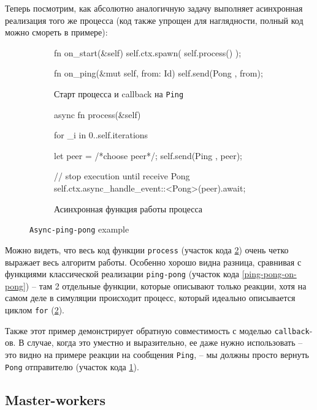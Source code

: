 Теперь посмотрим, как абсолютно аналогичную задачу выполняет асинхронная реализация того же процесса (код также упрощен для наглядности, полный код можно смореть в примере\cite{async-ping-pong-example}): 

\begin{figure}[H]
    \centering
    \begin{subfigure}[b]{0.45\linewidth}
        \footnotesize
        \centering
        \begin{rustcode}
fn on_start(&self) {
  self.ctx.spawn(
    self.process()
  );
}

fn on_ping(&mut self, from: Id) {
  self.send(Pong {}, from);
}    
    \end{rustcode}
        \caption{Старт процесса и callback на \texttt{Ping}}
        \label{start-async-ping-pong}
    \end{subfigure}
    \hfill
    \begin{subfigure}[b]{0.54\linewidth}
        \footnotesize
        \centering
        \begin{rustcode}
async fn process(&self) {
  for _i in 0..self.iterations {
    let peer = /*choose peer*/;
    self.send(Ping {}, peer);

    // stop execution until receive Pong
    self.ctx.async_handle_event::<Pong>(peer).await;
  }
}
    \end{rustcode}
    \caption{Асинхронная функция работы процесса}
    \label{async-ping-pong-action}
\end{subfigure}
\caption{\texttt{Async-ping-pong} example}
\label{async-ping-pong-code}
\end{figure}

Можно видеть, что весь код функции \texttt{process} (участок кода \ref{async-ping-pong-action}) очень четко выражает весь алгоритм работы. Особенно хорошо видна разница, сравнивая с функциями классической реализации \texttt{ping-pong} (участок кода \ref{ping-pong-on-pong}) -- там 2 отдельные функции, которые описывают только реакции, хотя на самом деле в симуляции происходит процесс, который идеально описывается циклом \texttt{for} (\ref{async-ping-pong-action}). 

Также этот пример демонстрирует обратную совместимость с моделью \texttt{callback}-ов. В случае, когда это уместно и выразительно, ее даже нужно использовать -- это видно на примере реакции на сообщения \texttt{Ping}, -- мы должны просто вернуть \texttt{Pong} отправителю (участок кода \ref{start-async-ping-pong}). 

\subsection{Master-workers}\label{master-workers-subsection}

